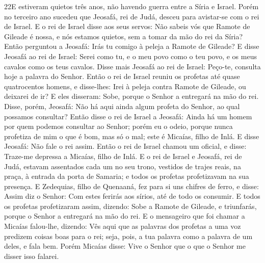 \lettrine{22} E estiveram quietos três anos, não havendo
guerra entre a Síria e Israel. Porém no terceiro ano sucedeu que
Jeosafá, rei de Judá, desceu para avistar-se com o rei de Israel.
E o rei de Israel disse aos seus servos: Não sabeis vós que
Ramote de Gileade é nossa, e nós estamos quietos, sem a tomar da mão
do rei da Síria? Então perguntou a Jeosafá: Irás tu comigo à
peleja a Ramote de Gileade? E disse Jeosafá ao rei de Israel: Serei
como tu, e o meu povo como o teu povo, e os meus cavalos como os
teus cavalos. Disse mais Jeosafá ao rei de Israel: Peço-te,
consulta hoje a palavra do Senhor. Então o rei de Israel reuniu
os profetas até quase quatrocentos homens, e disse-lhes: Irei à
peleja contra Ramote de Gileade, ou deixarei de ir? E eles disseram:
Sobe, porque o Senhor a entregará na mão do rei. Disse, porém,
Jeosafá: Não há aqui ainda algum profeta do Senhor, ao qual possamos
consultar? Então disse o rei de Israel a Jeosafá: Ainda há um
homem por quem podemos consultar ao Senhor; porém eu o odeio, porque
nunca profetiza de mim o que é bom, mas só o mal; este é Micaías,
filho de Inlá. E disse Jeosafá: Não fale o rei assim. Então o
rei de Israel chamou um oficial, e disse: Traze-me depressa a
Micaías, filho de Inlá. E o rei de Israel e Jeosafá, rei de
Judá, estavam assentados cada um no seu trono, vestidos de trajes
reais, na praça, à entrada da porta de Samaria; e todos os profetas
profetizavam na sua presença. E Zedequias, filho de Quenaaná,
fez para si uns chifres de ferro, e disse: Assim diz o Senhor: Com
estes ferirás aos sírios, até de todo os consumir. E todos os
profetas profetizaram assim, dizendo: Sobe a Ramote de Gileade, e
triunfarás, porque o Senhor a entregará na mão do rei. E o
mensageiro que foi chamar a Micaías falou-lhe, dizendo: Vês aqui que
as palavras dos profetas a uma voz predizem coisas boas para o rei;
seja, pois, a tua palavra como a palavra de um deles, e fala bem.
Porém Micaías disse: Vive o Senhor que o que o Senhor me
disser isso falarei.

